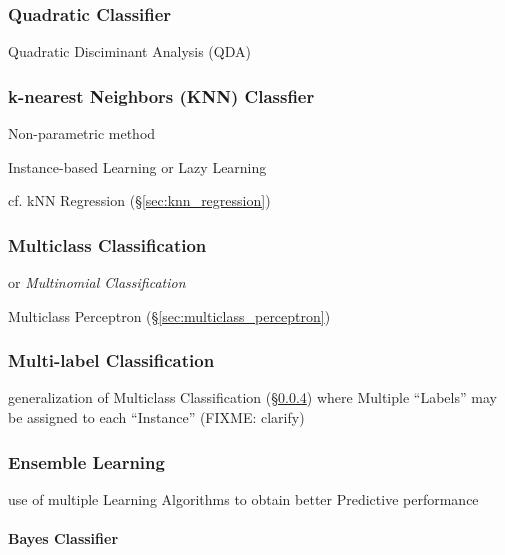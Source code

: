 \subsubsection{Quadratic Classifier}\label{sec:quadratic_classifier}

Quadratic Disciminant Analysis (QDA)



\subsubsection{k-nearest Neighbors (KNN) Classfier}\label{sec:knn_classifier}

Non-parametric method

Instance-based Learning or Lazy Learning

cf. kNN Regression (\S\ref{sec:knn_regression})



\subsubsection{Multiclass Classification}\label{sec:multiclass}

or \emph{Multinomial Classification}

Multiclass Perceptron (\S\ref{sec:multiclass_perceptron})



\subsubsection{Multi-label Classification}\label{sec:multiclass}

generalization of Multiclass Classification (\S\ref{sec:multiclass}) where
Multiple ``Labels'' may be assigned to each ``Instance'' (FIXME: clarify)



\subsubsection{Ensemble Learning}\label{sec:ensemble_learning}

use of multiple Learning Algorithms to obtain better Predictive performance



\paragraph{Bayes Classifier}\label{sec:bayes_classifier}\hfill


